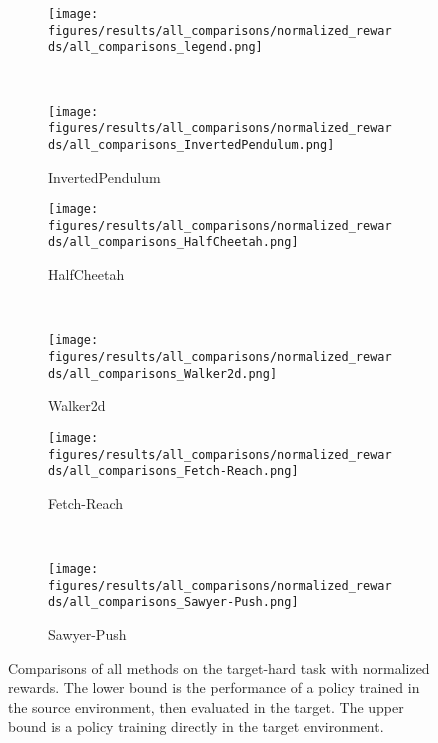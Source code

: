 \begin{figure}[ht]
    \centering
    \begin{subfigure}[t]{\linewidth}
        \centering
        \texttt{[image: figures/results/all\_comparisons/normalized\_rewards/all\_comparisons\_legend.png]}
    \end{subfigure}
    \\
    \begin{subfigure}[t]{0.45\linewidth}
        \centering
        \texttt{[image: figures/results/all\_comparisons/normalized\_rewards/all\_comparisons\_InvertedPendulum.png]}
        \caption{InvertedPendulum}
        \label{fig:result_step_norm:invertedpendulum}
    \end{subfigure}
    \begin{subfigure}[t]{0.45\linewidth}
        \centering
        \texttt{[image: figures/results/all\_comparisons/normalized\_rewards/all\_comparisons\_HalfCheetah.png]}
        \caption{HalfCheetah}
        \label{fig:result_step_norm:halfcheetah}
    \end{subfigure}
    \\
    \begin{subfigure}[t]{0.45\linewidth}
        \centering
        \texttt{[image: figures/results/all\_comparisons/normalized\_rewards/all\_comparisons\_Walker2d.png]}
        \caption{Walker2d}
        \label{fig:result_step_norm:walker2d}
    \end{subfigure}
    \begin{subfigure}[t]{0.45\linewidth}
        \centering
        \texttt{[image: figures/results/all\_comparisons/normalized\_rewards/all\_comparisons\_Fetch-Reach.png]}
        \caption{Fetch-Reach}
        \label{fig:result_step_norm:fetchreach}
    \end{subfigure}
    \\
    \begin{subfigure}[t]{0.45\linewidth}
        \centering
        \texttt{[image: figures/results/all\_comparisons/normalized\_rewards/all\_comparisons\_Sawyer-Push.png]}
        \caption{Sawyer-Push}
        \label{fig:result_step_norm:sawyer_push}
    \end{subfigure}
    \caption{
        Comparisons of all methods on the target-hard task with normalized rewards.  The lower bound is the performance of a policy trained in the source environment, then evaluated in the target.  The upper bound is a policy training directly in the target environment.
    }
\label{fig:result_step_norm}
\end{figure}


